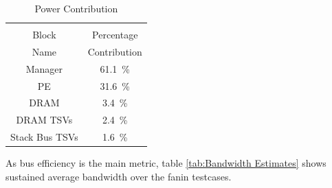 \documentclass[journal]{IEEEtran}
\begin{document}
\begin{table}[h]
\begin{subtable}{0.5\textwidth}
    \label{tab:Power Dissipation}
  \end{subtable}
  \bigskip
  \begin{subtable}{0.5\textwidth}
    \centering
    \begin{adjustbox}{width=0.55\textwidth}
      \begin{tabular}{cc}
        \toprule
                         &                                          \\  %
            Block        & Percentage                               \\  %
            Name         & Contribution                             \\  %
        \hline  %
                Manager  & \SI[per-mode=symbol]{61.1}{\percent}  \\ 
                     PE  & \SI[per-mode=symbol]{31.6}{\percent}  \\
                   DRAM  & \SI[per-mode=symbol]{ 3.4}{\percent}  \\
              DRAM TSVs  & \SI[per-mode=symbol]{ 2.4}{\percent}  \\
         Stack Bus TSVs  & \SI[per-mode=symbol]{ 1.6}{\percent}  \\
        \bottomrule
      \end{tabular}
    \end{adjustbox}
    \vspace{3pt}
    \captionsetup{justification=centering, skip=10pt}
    \caption{Power Contribution}
    \label{tab:Power Dissipation}
  \end{subtable}
  \end{table}

As bus efficiency is the main metric, table \ref{tab:Bandwidth Estimates} shows sustained average bandwidth over the fanin testcases.
\end{document}
